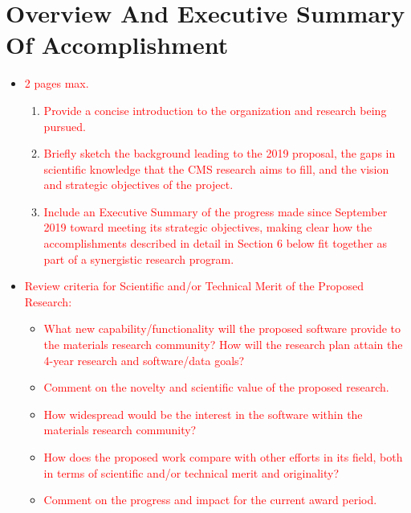 \section{Overview And Executive Summary Of Accomplishment}
\label{sec:overview}
{\small
\begin{itemize}
    \item \textcolor{red}{2 pages max.}
    \begin{enumerate}
        \item \textcolor{red}{Provide a concise introduction to the organization and research being pursued.}
        \item \textcolor{red}{Briefly sketch the background leading to the 2019 proposal, the gaps in scientific knowledge that the CMS research aims to fill, and the vision and strategic objectives of the project.}
        \item \textcolor{red}{Include an Executive Summary of the progress made since September 2019 toward
meeting its strategic objectives, making clear how the accomplishments described in detail in Section 6 below fit together as part of a synergistic research program.}
    \end{enumerate}
    \item \textcolor{red}{Review criteria for Scientific and/or Technical Merit of the Proposed Research:}
    \begin{itemize}
        \item \textcolor{red}{What new capability/functionality will the proposed software provide to the materials research community? How will the research plan attain the 4-year research and software/data goals?}
        \item \textcolor{red}{Comment on the novelty and scientific value of the proposed research. }
        \item \textcolor{red}{How widespread would be the interest in the software within the materials research community?}
        \item \textcolor{red}{How does the proposed work compare with other efforts in its field, both in terms of scientific and/or technical merit and originality?}
        \item \textcolor{red}{Comment on the progress and impact for the current award period.}
    \end{itemize}

\end{itemize}
}

\clearpage


